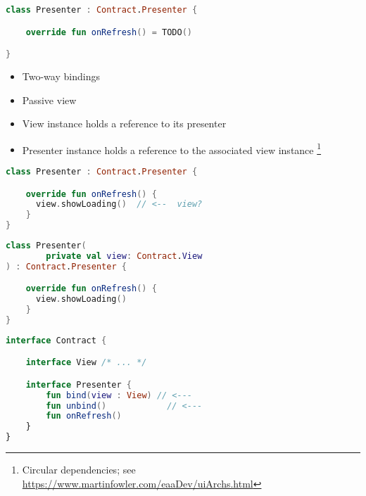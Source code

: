 \documentclass[10pt]{beamer}
\begin{document}
\begin{frame}[fragile]
\begin{lstlisting}[language=Kotlin, basicstyle=\ttfamily]
class Presenter : Contract.Presenter { 

    override fun onRefresh() = TODO()

}
\end{lstlisting}
\end{frame}

\begin{frame}[fragile]
\begin{itemize}
\item Two-way bindings 
\item Passive view 
\end{itemize}
\end{frame}
\begin{frame}[fragile]
\begin{itemize}
\item View instance holds a reference to its presenter
\item Presenter instance holds a reference to the associated view  instance%
\footnote{%
Circular dependencies; see 
\url{https://www.martinfowler.com/eaaDev/uiArchs.html}
}
\end{itemize}
\end{frame}




\begin{frame}[fragile]
\begin{lstlisting}[language=Kotlin, basicstyle=\ttfamily]
class Presenter : Contract.Presenter {

    override fun onRefresh() {
      view.showLoading()  // <--  view?
    }
}

\end{lstlisting}
\end{frame}

\begin{frame}[fragile]
\begin{lstlisting}[language=Kotlin, basicstyle=\ttfamily]
class Presenter( 
        private val view: Contract.View
) : Contract.Presenter {

    override fun onRefresh() {
      view.showLoading()
    }
}
\end{lstlisting}
\end{frame}

\begin{frame}[fragile]
\begin{lstlisting}[language=Kotlin, basicstyle=\ttfamily]
interface Contract {

    interface View /* ... */

    interface Presenter {
        fun bind(view : View) // <---
        fun unbind()            // <---
        fun onRefresh()
    }
}
\end{lstlisting}
\end{frame}
\end{document}

